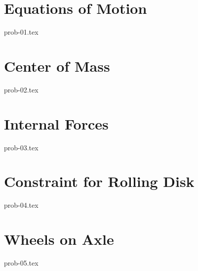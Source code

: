 \section{Equations of Motion}

{prob-01.tex}

\section{Center of Mass}

{prob-02.tex}

\section{Internal Forces}

{prob-03.tex}

\section{Constraint for Rolling Disk}\label{rollingdisk}

{prob-04.tex}

\section{Wheels on Axle}

{prob-05.tex}
